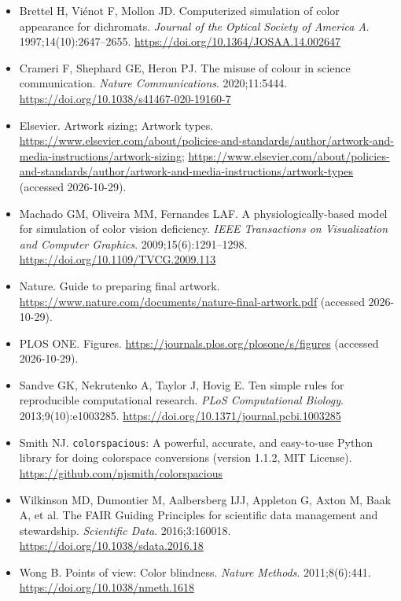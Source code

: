 \begin{itemize}
\item Brettel H, Vi\'{e}not F, Mollon JD. Computerized simulation of color appearance for dichromats. \textit{Journal of the Optical Society of America A}. 1997;14(10):2647--2655. \url{https://doi.org/10.1364/JOSAA.14.002647}
\item Crameri F, Shephard GE, Heron PJ. The misuse of colour in science communication. \textit{Nature Communications}. 2020;11:5444. \url{https://doi.org/10.1038/s41467-020-19160-7}
\item Elsevier. Artwork sizing; Artwork types. \url{https://www.elsevier.com/about/policies-and-standards/author/artwork-and-media-instructions/artwork-sizing}; \url{https://www.elsevier.com/about/policies-and-standards/author/artwork-and-media-instructions/artwork-types} (accessed 2026-10-29).
\item Machado GM, Oliveira MM, Fernandes LAF. A physiologically-based model for simulation of color vision deficiency. \textit{IEEE Transactions on Visualization and Computer Graphics}. 2009;15(6):1291--1298. \url{https://doi.org/10.1109/TVCG.2009.113}
\item Nature. Guide to preparing final artwork. \url{https://www.nature.com/documents/nature-final-artwork.pdf} (accessed 2026-10-29).
\item PLOS ONE. Figures. \url{https://journals.plos.org/plosone/s/figures} (accessed 2026-10-29).
\item Sandve GK, Nekrutenko A, Taylor J, Hovig E. Ten simple rules for reproducible computational research. \textit{PLoS Computational Biology}. 2013;9(10):e1003285. \url{https://doi.org/10.1371/journal.pcbi.1003285}
\item Smith NJ. \texttt{colorspacious}: A powerful, accurate, and easy-to-use Python library for doing colorspace conversions (version 1.1.2, MIT License). \url{https://github.com/njsmith/colorspacious}
\item Wilkinson MD, Dumontier M, Aalbersberg IJJ, Appleton G, Axton M, Baak A, et al. The FAIR Guiding Principles for scientific data management and stewardship. \textit{Scientific Data}. 2016;3:160018. \url{https://doi.org/10.1038/sdata.2016.18}
\item Wong B. Points of view: Color blindness. \textit{Nature Methods}. 2011;8(6):441. \url{https://doi.org/10.1038/nmeth.1618}
\end{itemize}

